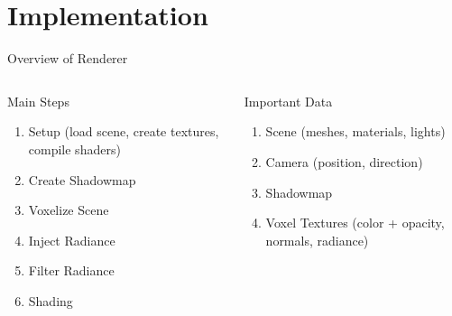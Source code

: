 \documentclass[10pt]{beamer}
\begin{document}
\section{Implementation}

\begin{frame}{Overview of Renderer}

  \begin{columns}
    \begin{column}{0.5\textwidth}
      \begin{block}{Main Steps}
        \begin{enumerate}
          \item Setup (load scene, create textures, compile shaders)
          \item Create Shadowmap
          \item Voxelize Scene
          \item Inject Radiance
          \item Filter Radiance
          \item Shading
        \end{enumerate}
      \end{block}
    \end{column}
    \begin{column}{0.5\textwidth}
      \begin{block}{Important Data}
        \begin{enumerate}
          \item Scene (meshes, materials, lights)
          \item Camera (position, direction) %
          \item Shadowmap %
          \item Voxel Textures (color + opacity, normals, radiance)
        \end{enumerate}
      \end{block}
    \end{column}
  \end{columns}
\end{frame}
\end{document}
